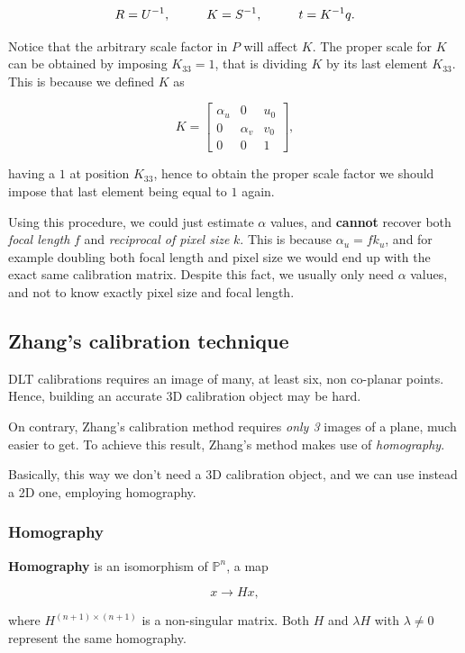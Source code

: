 \documentclass[10pt]{report}
\begin{document}
\[ R = U^{-1}, \hspace*{1cm} K = S^{-1}, \hspace*{1cm} t = K^{-1}q. \]

Notice that the arbitrary scale factor in \(P\) will affect \(K\). The
proper scale for \(K\) can be obtained by imposing \(K_{33} = 1\), that
is dividing \(K\) by its last element \(K_{33}\). This is because we
defined \(K\) as

\[K = \begin{bmatrix} \alpha_u & 0 & u_0 \\ 0 & \alpha_v & v_0 \\ 0 & 0 & 1\end{bmatrix},\]

having a \(1\) at position \(K_{33}\), hence to obtain the proper scale
factor we should impose that last element being equal to \(1\) again.

Using this procedure, we could just estimate \(\alpha\) values, and
\textbf{cannot} recover both \emph{focal length} \(f\) and \emph{reciprocal of pixel
size} \(k\). This is because \(\alpha_u = fk_u\), and for example
doubling both focal length and pixel size we would end up with the exact
same calibration matrix. Despite this fact, we usually only need
\(\alpha\) values, and not to know exactly pixel size and focal length.

\subsection{Zhang's calibration technique}
\label{zhangs-calibration-technique}
DLT calibrations requires an image of many, at least six, non co-planar
points. Hence, building an accurate 3D calibration object may be hard.

On contrary, Zhang's calibration method requires \emph{only 3} images of a
plane, much easier to get. To achieve this result, Zhang's method makes
use of \emph{homography}.

Basically, this way we don't need a 3D calibration object, and we can
use instead a 2D one, employing homography.

\subsubsection{Homography}
\label{whats-homography}
\textbf{Homography} is an isomorphism of \(\mathbb{P}^n\), a map

\[ x \rightarrow Hx, \]

where \(H^{(n+1) \times (n+1)}\) is a non-singular matrix. Both \(H\)
and \(\lambda H\) with \(\lambda \neq 0\) represent the same homography.
\end{document}
